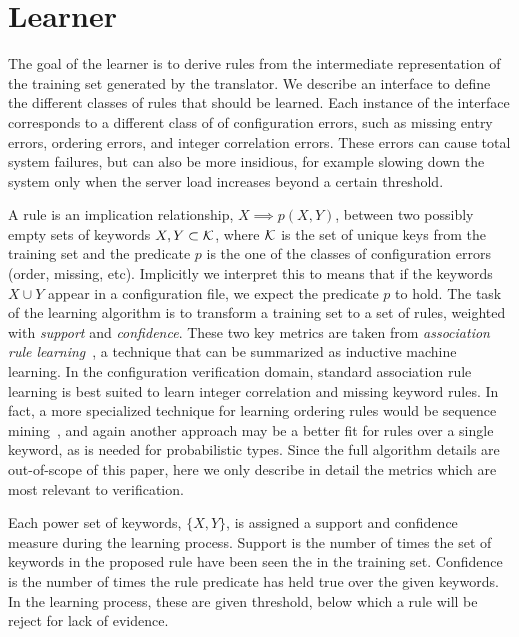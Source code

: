 \section{Learner}
\label{sec-learn}

The goal of the learner is to derive rules from the intermediate representation of the training set generated by the translator.
We describe an interface to define the different classes of rules that should be learned.
Each instance of the interface corresponds to a different class of of configuration errors, such as missing entry errors, ordering errors, and integer correlation errors. 
These errors can cause total system failures, but can also be more insidious, for example slowing down the system only when the server load increases beyond a certain threshold.


A rule is an implication relationship, $X \implies p(X,Y)$, between two possibly empty sets of keywords $X,Y \subset \mathcal{K}$, where $\mathcal{K}$ is the set of unique keys from the training set and the predicate $p$ is the one of the classes of configuration errors (order, missing, etc).
Implicitly we interpret this to means that if the keywords $X\cup Y$ appear in a configuration file, we expect the predicate $p$ to hold.
The task of the learning algorithm is to transform a training set to a set of rules, weighted with \textit{support} and \textit{confidence}.
These two key metrics are taken from \textit{association rule learning}~\cite{agrawal1993mining}, a technique that can be summarized as inductive machine learning.
In the configuration verification domain, standard association rule learning is best suited to learn integer correlation and missing keyword rules.
In fact, a more specialized technique for learning ordering rules would be sequence mining~\cite{}, and again another approach may be a better fit for rules over a single keyword, as is needed for probabilistic types.
Since the full algorithm details are out-of-scope of this paper, here we only describe in detail the metrics which are most relevant to verification.

Each power set of keywords, $\{X,Y\}$, is assigned a support and confidence measure during the learning process.
Support is the number of times the set of keywords in the proposed rule have been seen the in the training set.
Confidence is the number of times the rule predicate has held true over the given keywords.
In the learning process, these are given threshold, below which a rule will be reject for lack of evidence.

